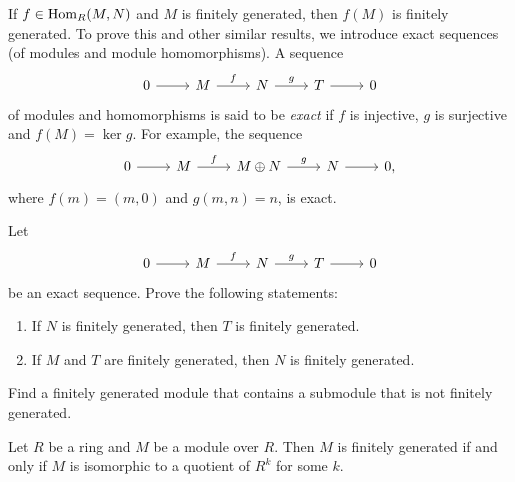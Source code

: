 If $f\in\operatorname{Hom}_R(M,N)$ and $M$ is finitely generated, then 
$f(M)$ is finitely generated. To prove this and other similar results, 
we introduce exact sequences (of modules and module homomorphisms). 
A sequence 
	\begin{equation}
	\label{eq:exacta1}	
    \begin{tikzcd}
	0 & M & N & T & 0
	\arrow[from=1-1, to=1-2]
	\arrow["f", from=1-2, to=1-3]
	\arrow["g", from=1-3, to=1-4]
	\arrow[from=1-4, to=1-5]
    \end{tikzcd}
  	\end{equation}
of modules and homomorphisms is said to be \emph{exact} 
if $f$ is injective, $g$ is surjective and $f(M)=\ker g$. For example,
the sequence
\[
\begin{tikzcd}
	0 & M & M\oplus N & N & 0,
	\arrow[from=1-1, to=1-2]
	\arrow["f", from=1-2, to=1-3]
	\arrow["g", from=1-3, to=1-4]
	\arrow[from=1-4, to=1-5]
\end{tikzcd}
\]
where $f(m)=(m,0)$ and $g(m,n)=n$, is exact.

\begin{exercise}
	Let 
\[\begin{tikzcd}
	0 & M & N & T & 0
	\arrow[from=1-1, to=1-2]
	\arrow["f", from=1-2, to=1-3]
	\arrow["g", from=1-3, to=1-4]
	\arrow[from=1-4, to=1-5]
\end{tikzcd}
\]
     be an exact sequence. Prove the following statements: 
     \begin{enumerate}
     \item If $N$ is finitely generated, then $T$ is finitely generated. 
     \item If $M$ and $T$ are finitely generated, then $N$ is finitely generated. 	
     \end{enumerate}
\end{exercise}

\begin{exercise}
\label{xca:submodule_notfg}
Find a finitely generated module that contains a submodule 
that is not finitely generated. 
\end{exercise}

\begin{proposition}
    Let $R$ be a ring and $M$ be a module over $R$. 
    Then $M$ is finitely generated if and only 
    if $M$ is isomorphic to a quotient of $R^k$ for some $k$.
\end{proposition}


